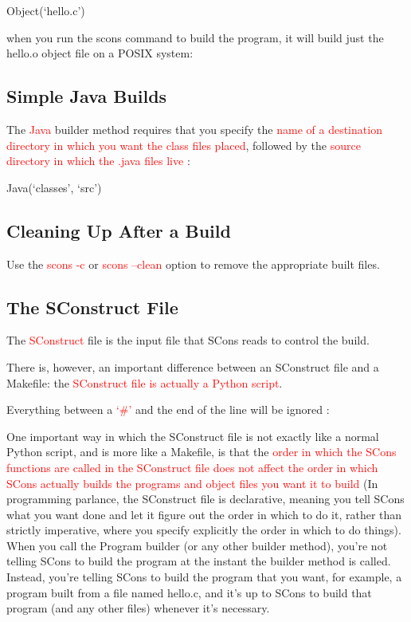 \documentclass[12pt,a4paper]{article}
\begin{document}
Object(`hello.c')

when you run the scons command to build the program, it will build just the hello.o object file on a POSIX system:



\subsection{Simple Java Builds}
The \textcolor{red}{Java} builder method requires that you specify the \textcolor{red}{name of a destination directory in which you want the class files placed}, followed by the \textcolor{red}{source directory in which the .java files live} :

Java(`classes', `src')

\subsection{Cleaning Up After a Build}
Use the \textcolor{red}{scons -c} or \textcolor{red}{scons --clean} option to remove the appropriate built files. 


\subsection{The SConstruct File}
The \textcolor{red}{SConstruct} file is the input file that SCons reads to control the build.

There is, however, an important difference between an SConstruct file and a Makefile: the \textcolor{red}{SConstruct file is actually a Python script}.

Everything between a \textcolor{red}{`$\#$'} and the end of the line will be ignored :

One important way in which the SConstruct file is not exactly like a normal Python script, and is more like a Makefile, is that the \textcolor{red}{order in which the SCons functions are called in the SConstruct file does not affect the order in which SCons actually builds the programs and object files you want it to build} (In programming parlance, the SConstruct file is declarative, meaning you tell SCons what you want done and let it figure out the order in which to do it, rather than strictly imperative, where you specify explicitly the order in which to do things). When you call the Program builder (or any other builder method), you're not telling SCons to build the program at the instant the builder method is called. Instead, you're telling SCons to build the program that you want, for example, a program built from a file named hello.c, and it's up to SCons to build that program (and any other files) whenever it's necessary. 
\end{document}
